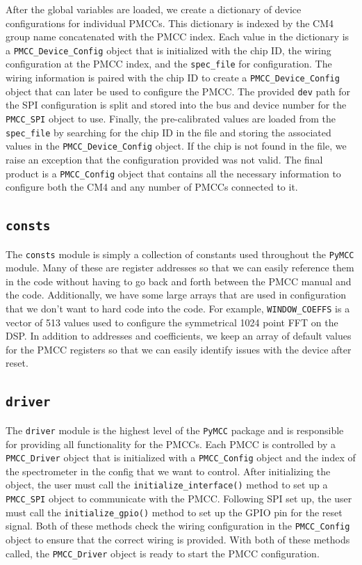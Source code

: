After the global variables are loaded, we create a dictionary of device configurations for individual PMCCs. 
This dictionary is indexed by the CM4 group name concatenated with the PMCC index.
Each value in the dictionary is a \texttt{PMCC\_Device\_Config} object that is initialized with the chip ID, the wiring configuration at the PMCC index, and the \texttt{spec\_file} for configuration.
The wiring information is paired with the chip ID to create a \texttt{PMCC\_Device\_Config} object that can later be used to configure the PMCC. 
The provided \texttt{dev} path for the SPI configuration is split and stored into the bus and device number for the \texttt{PMCC\_SPI} object to use.
Finally, the pre-calibrated values are loaded from the \texttt{spec\_file} by searching for the chip ID in the file and storing the associated values in the \texttt{PMCC\_Device\_Config} object.
If the chip is not found in the file, we raise an exception that the configuration provided was not valid. 
The final product is a \texttt{PMCC\_Config} object that contains all the necessary information to configure both the CM4 and any number of PMCCs connected to it. 

\subsection{\texttt{consts}}
The \texttt{consts} module is simply a collection of constants used throughout the \texttt{PyMCC} module.
Many of these are register addresses so that we can easily reference them in the code without having to go back and forth between the PMCC manual and the code.
Additionally, we have some large arrays that are used in configuration that we don't want to hard code into the code.
For example, \texttt{WINDOW\_COEFFS} is a vector of 513 values used to configure the symmetrical 1024 point FFT on the DSP. 
In addition to addresses and coefficients, we keep an array of default values for the PMCC registers so that we can easily identify issues with the device after reset. 

\subsection{\texttt{driver}}
The \texttt{driver} module is the highest level of the \texttt{PyMCC} package and is responsible for providing all functionality for the PMCCs. 
Each PMCC is controlled by a \texttt{PMCC\_Driver} object that is initialized with a \texttt{PMCC\_Config} object and the index of the spectrometer in the config that we want to control.
After initializing the object, the user must call the \texttt{initialize\_interface()} method to set up a \texttt{PMCC\_SPI} object to communicate with the PMCC.
Following SPI set up, the user must call the \texttt{initialize\_gpio()} method to set up the GPIO pin for the reset signal.
Both of these methods check the wiring configuration in the \texttt{PMCC\_Config} object to ensure that the correct wiring is provided.
With both of these methods called, the \texttt{PMCC\_Driver} object is ready to start the PMCC configuration. 

